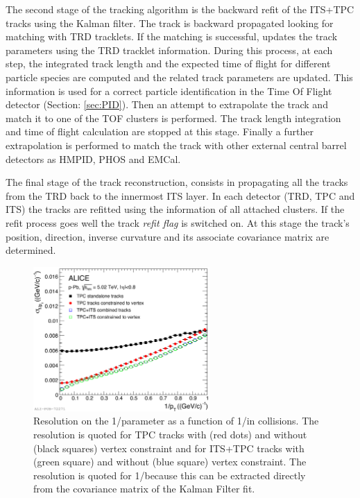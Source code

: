 The second stage of the tracking algorithm is the backward refit of the ITS+TPC tracks using the
Kalman filter.
The track is backward propagated looking for matching with TRD tracklets. If the matching is
successful, updates the track parameters using the TRD tracklet information. 
During this process, at each step, the integrated track length and the expected time of flight
for different particle species are computed and the related track parameters are updated.
This information is used for a correct particle identification in the Time Of Flight detector
(Section: \ref{sec:PID}).
Then an attempt to extrapolate the track and match it to one of the TOF clusters is performed.
The track length integration and time of flight calculation are stopped at this stage.
Finally a further extrapolation is performed to match the track with other external central
barrel detectors as HMPID, PHOS and EMCal.

The final stage of the track reconstruction, consists in propagating all the tracks from the TRD
back to the innermost ITS layer. 
In each detector (TRD, TPC and ITS) the tracks are refitted using the information of all attached
clusters.
If the refit process goes well the track \textit{refit flag} is switched on.
At this stage the track’s position, direction, inverse curvature and its associate covariance 
matrix are determined.

\begin{figure}
    \centering
    \includegraphics[width=0.6\textwidth]{gfx/ptresolution}
	\caption{Resolution on the 1/\pt parameter as a function of 1/\pt in \pPb collisions. The resolution is quoted for TPC tracks with (red dots) and without (black squares) vertex constraint and for ITS+TPC tracks with (green square) and without (blue square) vertex constraint. The resolution is quoted for 1/\pt because this can be extracted directly from the covariance matrix of the Kalman Filter fit.}
	\label{fig:vertres}
\end{figure}

